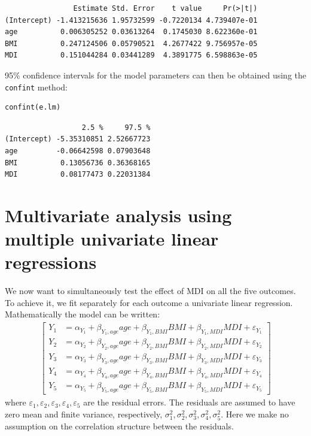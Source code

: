 \documentclass{article}
\begin{document}
\begin{verbatim}
                Estimate Std. Error    t value     Pr(>|t|)
(Intercept) -1.413215636 1.95732599 -0.7220134 4.739407e-01
age          0.006305252 0.03613264  0.1745030 8.622360e-01
BMI          0.247124506 0.05790521  4.2677422 9.756957e-05
MDI          0.151044284 0.03441289  4.3891775 6.598863e-05
\end{verbatim}

95\% confidence intervals for the model parameters can then be obtained
using the \texttt{confint} method:
\lstset{language=r,label= ,caption= ,captionpos=b,numbers=none}
\begin{lstlisting}
confint(e.lm)
\end{lstlisting}

\begin{verbatim}
                  2.5 %     97.5 %
(Intercept) -5.35310851 2.52667723
age         -0.06642598 0.07903648
BMI          0.13056736 0.36368165
MDI          0.08177473 0.22031384
\end{verbatim}

\clearpage

\section{Multivariate analysis using multiple univariate linear regressions}
\label{sec:multipleLM}
We now want to simultaneously test the effect of MDI on all the five
outcomes. To achieve it, we fit separately for each outcome a
univariate linear regression. Mathematically the model can be written:
\begin{align*}
\begin{bmatrix} 
Y_1  &= \alpha_{Y_{1}} + \beta_{Y_1,age} age + \beta_{Y_1,BMI} BMI + \beta_{Y_1,MDI} MDI + \varepsilon_{Y_1} \\
Y_2  &= \alpha_{Y_{2}} + \beta_{Y_2,age} age + \beta_{Y_2,BMI} BMI + \beta_{Y_2,MDI} MDI + \varepsilon_{Y_2} \\
Y_3  &= \alpha_{Y_{3}} + \beta_{Y_3,age} age + \beta_{Y_3,BMI} BMI + \beta_{Y_3,MDI} MDI + \varepsilon_{Y_3} \\
Y_4  &= \alpha_{Y_{4}} + \beta_{Y_4,age} age + \beta_{Y_4,BMI} BMI + \beta_{Y_4,MDI} MDI + \varepsilon_{Y_4} \\
Y_5  &= \alpha_{Y_{5}} + \beta_{Y_5,age} age + \beta_{Y_5,BMI} BMI + \beta_{Y_5,MDI} MDI + \varepsilon_{Y_5} 
\end{bmatrix} 
\end{align*}
where
\(\varepsilon_{1},\varepsilon_{2},\varepsilon_{3},\varepsilon_{4},\varepsilon_{5}\)
are the residual errors. The residuals are assumed to have zero mean
and finite variance, respectively,
\(\sigma^2_{1},\sigma^2_{2},\sigma^2_{3},\sigma^2_{4},\sigma^2_{5}\). Here
we make no assumption on the correlation structure between the
residuals.
\end{document}
